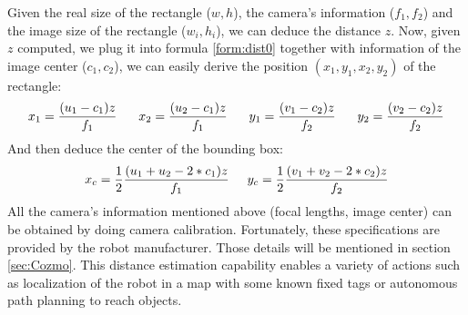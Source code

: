 Given the real size of the rectangle ($w, h$), the camera's information ($f_1, f_2$) and the image size of the rectangle ($w_i, h_i$), we can deduce the distance $z$. Now, given $z$ computed, we plug it into formula \ref{form:dist0} together with information of the image center ($c_1, c_2$), we can easily derive the position $(x_1, y_1, x_2, y_2)$ of the rectangle:
\begin{align}
	x_1 = \frac{(u_1 - c_1)z}{f_1} \hspace{0.6cm}
	x_2 = \frac{(u_2 - c_1)z}{f_1} \hspace{0.6cm}
	y_1 = \frac{(v_1 - c_2)z}{f_2} \hspace{0.6cm}
	y_2 = \frac{(v_2 - c_2)z}{f_2} 
\end{align}
And then deduce the center of the bounding box:
\begin{align}
	\label{form:centerIm}
x_c = \frac{1}{2}\frac{(u_1 + u_2 - 2 * c_1)z}{f_1} \hspace{0.5cm} y_c = \frac{1}{2}\frac{(v_1 + v_2 - 2*c_2)z}{f_2}
\end{align}
All the camera's information mentioned above (focal lengths, image center) can be obtained by doing camera calibration. Fortunately, these specifications are provided by the robot manufacturer. Those details will be mentioned in section \ref{sec:Cozmo}.
This distance estimation capability enables a variety of actions such as localization of the robot in a map with some known fixed tags or autonomous path planning to reach objects.